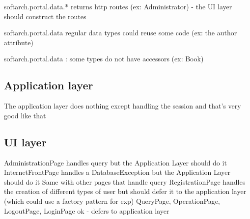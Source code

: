 softarch.portal.data.* returns http routes (ex: Administrator) - the UI layer should construct the routes

softarch.portal.data regular data types could reuse some code (ex: the author attribute)

softarch.portal.data : some types do not have accessors (ex: Book)

\subsection{Application layer}

The application layer does nothing except handling the session and that's very good like that

\subsection{UI layer}

AdministrationPage handles query but the Application Layer should do it InternetFrontPage handles a DatabaseException but the Application Layer should do it Same with other pages that handle query RegistrationPage handles the creation of different types of user but should defer it to the application layer (which could use a factory pattern for exp) QueryPage, OperationPage, LogoutPage, LoginPage ok - defers to application layer
